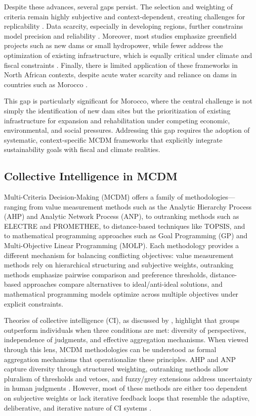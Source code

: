 Despite these advances, several gaps persist. The selection and weighting of criteria remain highly subjective and context-dependent, creating challenges for replicability \cite{Belton2002,Mardani2015}. Data scarcity, especially in developing regions, further constrains model precision and reliability \cite{POHEKAR2004,Dirie2024}. Moreover, most studies emphasize greenfield projects such as new dams or small hydropower, while fewer address the optimization of existing infrastructure, which is equally critical under climate and fiscal constraints \cite{KUMAR2017596,Romanelli2018}. Finally, there is limited application of these frameworks in North African contexts, despite acute water scarcity and reliance on dams in countries such as Morocco \cite{ettazarini2021}.

This gap is particularly significant for Morocco, where the central challenge is not simply the identification of new dam sites but the prioritization of existing infrastructure for expansion and rehabilitation under competing economic, environmental, and social pressures. Addressing this gap requires the adoption of systematic, context-specific MCDM frameworks that explicitly integrate sustainability goals with fiscal and climate realities.

\subsection{Collective Intelligence in MCDM}
Multi-Criteria Decision-Making (MCDM) offers a family of methodologies—ranging from value measurement methods such as the Analytic Hierarchy Process (AHP) and Analytic Network Process (ANP), to outranking methods such as ELECTRE and PROMETHEE, to distance-based techniques like TOPSIS, and to mathematical programming approaches such as Goal Programming (GP) and Multi-Objective Linear Programming (MOLP)\cite{Belton2002,Aruldoss2013}. Each methodology provides a different mechanism for balancing conflicting objectives: value measurement methods rely on hierarchical structuring and subjective weights, outranking methods emphasize pairwise comparison and preference thresholds, distance-based approaches compare alternatives to ideal/anti-ideal solutions, and mathematical programming models optimize across multiple objectives under explicit constraints.

Theories of collective intelligence (CI), as discussed by \cite{Woolley2010}, highlight that groups outperform individuals when three conditions are met: diversity of perspectives, independence of judgments, and effective aggregation mechanisms. When viewed through this lens, MCDM methodologies can be understood as formal aggregation mechanisms that operationalize these principles. AHP and ANP capture diversity through structured weighting, outranking methods allow pluralism of thresholds and vetoes, and fuzzy/grey extensions address uncertainty in human judgments \cite{Mardani2015,LIANG1999}. However, most of these methods are either too dependent on subjective weights or lack iterative feedback loops that resemble the adaptive, deliberative, and iterative nature of CI systems \cite{Cinalli2015}.

